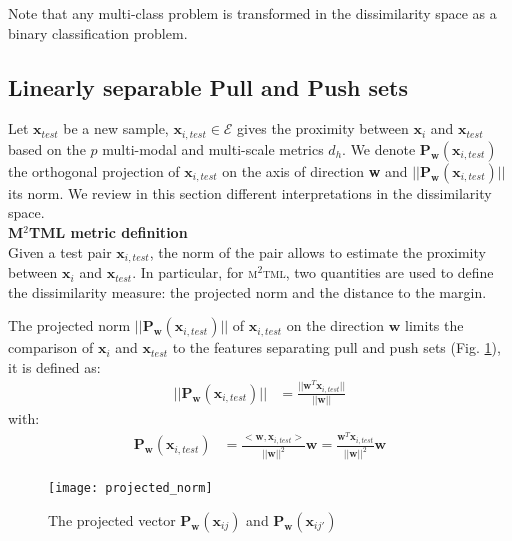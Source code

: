 \noindent Note that any multi-class problem is transformed in the dissimilarity space as a binary classification problem.

\subsection{Linearly separable Pull and Push sets}
Let $\textbf{x}_{test}$ be a new sample, $\textbf{x}_{i,test} \in \mathcal{E}$ gives the proximity between $\textbf{x}_{i}$ and $\textbf{x}_{test}$ based on the $p$ multi-modal and multi-scale metrics $d_h$. We denote $\textbf{P}_\textbf{w}(\textbf{x}_{i,test})$ the orthogonal projection of $\textbf{x}_{i,test}$ on the axis of direction \textbf{w} and $||\textbf{P}_\textbf{w}(\textbf{x}_{i,test})||$ its norm. We review in this section different interpretations in the dissimilarity space. \\

\noindent \textbf{M$^2$TML metric definition} \\
Given a test pair $\textbf{x}_{i,test}$, the norm of the pair allows to estimate the proximity between $\textbf{x}_{i}$ and $\textbf{x}_{test}$. In particular, for \textsc{m$^2$tml}, two quantities are used to define the dissimilarity measure: the projected norm and the distance to the margin.

\noindent The projected norm $||\textbf{P}_\textbf{w}(\textbf{x}_{i,test})||$ of $\textbf{x}_{i,test}$ on the direction $\textbf{w}$ limits the comparison of $\textbf{x}_{i}$ and $\textbf{x}_{test}$ to the features separating pull and push sets (Fig. \ref{fig:projected_norm}), it is defined as:
\begin{align}
	||\textbf{P}_\textbf{w}(\textbf{x}_{i,test})|| 
	&= 
	\frac{||\textbf{w}^T\textbf{x}_{i,test}||}{||\textbf{w}||}
	\label{eq:projected_norm}
\end{align}
\noindent with:
\begin{align}
	\textbf{P}_\textbf{w}(\textbf{x}_{i,test}) 
	&= 
	\frac{<\textbf{w},\textbf{x}_{i,test}>}{||\textbf{w}||^2} \textbf{w} = \frac{\textbf{w}^T\textbf{x}_{i,test}}{||\textbf{w}||^2} \textbf{w}
	\label{eq:projected}
\end{align}	
\begin{figure}[h!]
	\centering
	\texttt{[image: projected\_norm]}
	\caption{The projected vector $\textbf{P}_\textbf{w}(\textbf{x}_{ij})$ and $\textbf{P}_\textbf{w}(\textbf{x}_{ij'})$}
	\label{fig:projected_norm}
\end{figure}

